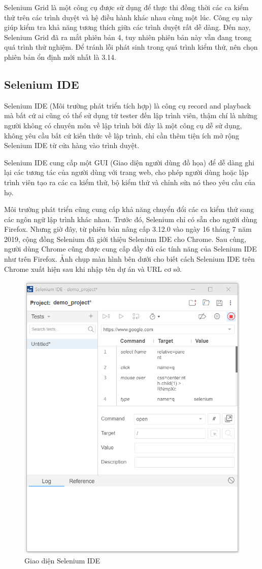 \documentclass[./../main_file.tex]{subfiles}
\begin{document}
	Selenium Grid là một công cụ được sử dụng để thực thi đồng thời các ca kiểm thử trên các trình duyệt và hệ điều hành khác nhau cùng một lúc. Công cụ này giúp kiểm tra khả năng tương thích giữa các trình duyệt rất dễ dàng. Đến nay, Selenium Grid đã ra mắt phiên bản 4, tuy nhiên phiên bản này vẫn đang trong quá trình thử nghiệm. Để tránh lỗi phát sinh trong quá trình kiểm thử, nên chọn phiên bản ổn định mới nhất là 3.14.
	
	\subsection{Selenium IDE}
	
	Selenium IDE (Môi trường phát triển tích hợp) là công cụ record and playback mà bất cứ ai cũng có thể sử dụng từ tester đến lập trình viên, thậm chí là những người không có chuyên môn về lập trình bởi đây là một công cụ dễ sử dụng, không yêu cầu bất cứ kiến thức về lập trình, chỉ cần thêm tiện ích mở rộng Selenium IDE từ cửa hàng vào trình duyệt.
	
	Selenium IDE cung cấp một GUI (Giao diện người dùng đồ họa) để dễ dàng ghi lại các tương tác của người dùng với trang web, cho phép người dùng hoặc lập trình viên tạo ra các ca kiểm thử, bộ kiểm thử và chỉnh sửa nó theo yêu cầu của họ.
	
	Môi trường phát triển cũng cung cấp khả năng chuyển đổi các ca kiểm thử sang các ngôn ngữ lập trình khác nhau. Trước đó, Selenium chỉ có sẵn cho người dùng Firefox. Nhưng giờ đây, từ phiên bản nâng cấp 3.12.0 vào ngày 16 tháng 7 năm 2019, cộng đồng Selenium đã giới thiệu Selenium IDE cho Chrome. Sau cùng, người dùng Chrome cũng được cung cấp đầy đủ các tính năng của Selenium IDE như trên Firefox. Ảnh chụp màn hình bên dưới cho biết cách Selenium IDE trên Chrome xuất hiện sau khi nhập tên dự án và URL cơ sở.
	
	\begin{figure}[H]
		\centering
		\includegraphics[width=0.7\linewidth]{./images/image10.png}
		\caption{Giao diện Selenium IDE}
	\end{figure}
\end{document}
